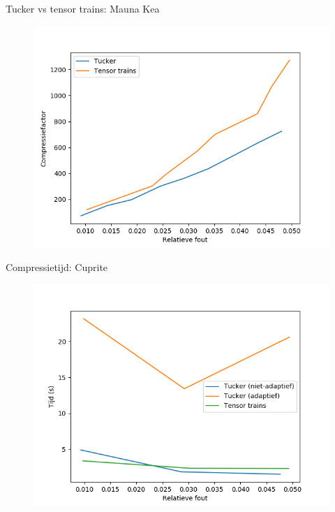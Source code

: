 \documentclass[t,12pt,dutch
\ifx\beamermode\undefined\else,\beamermode\fi
]{beamer}
\begin{document}
\begin{frame}{Tucker vs tensor trains: Mauna Kea}

\begin{figure}[H]
\centering
\includegraphics[scale=0.5]{images/tucker_vs_tensor_trains_Mauna_Kea.png}
\end{figure}

\end{frame}

\begin{frame}{Compressietijd: Cuprite}

\begin{figure}[H]
\centering
\includegraphics[scale=0.5]{images/tucker_vs_tensor_trains_times_Cuprite.png}
\end{figure}

\end{frame}
\end{document}
